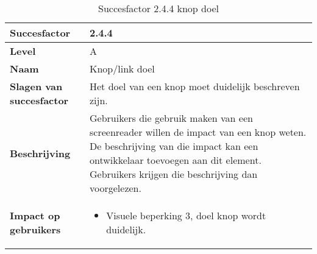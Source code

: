 \begin{table}[H]
    \centering
    \caption{Succesfactor 2.4.4 knop doel}
    
    
    \hspace*{-1cm}\begin{tabular}{|l|p{12cm}|} 
        \hline
        \textbf{Succesfactor}                 & 2.4.4                                                                                                                                                                                                                                                                                                                                                                                                                                                                                                          \\ 
        \hline
        \textbf{Level}                        & A                                                                                                                                                                                                                                                                                                                                                                                                                                                                                                                 \\ 
        \hline
        \textbf{Naam}                         & Knop/link doel~                                                                                                                                                                                                                                                                                                                                                                                                                                                                                      \\ 
        \hline
        \textbf{Slagen van succesfactor}      & Het doel van een knop moet duidelijk beschreven zijn.                                                                                                                                 \\ 
        
        \hline
        \textbf{Beschrijving}                 & Gebruikers die gebruik maken van een screenreader willen de impact van een knop weten. De beschrijving van die impact kan een ontwikkelaar toevoegen aan dit element. Gebruikers krijgen die beschrijving dan voorgelezen.\\ 
        \hline
        \textbf{Impact op gebruikers}         &  
        \begin{itemize}
            \item Visuele beperking 3, doel knop wordt duidelijk.
           

\end{itemize}
\end{tabular}
\end{table}
